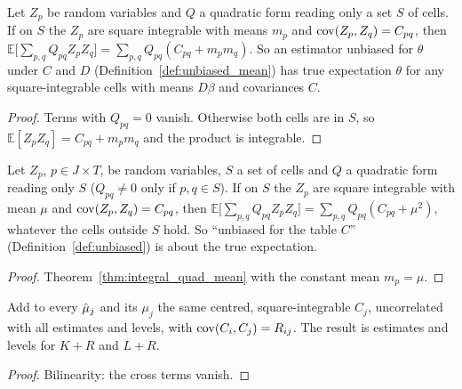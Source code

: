 \begin{theorem}\label{thm:integral_quad_mean}
  \leanok
  Let $Z_p$ be random variables and $Q$ a quadratic form reading only a set $S$ of cells. If
  on $S$ the $Z_p$ are square integrable with means $m_p$ and $\operatorname{cov}(Z_p,Z_q) = C_{pq}$, then
  $\mathbb E\bigl[\sum_{p,q} Q_{pq}Z_pZ_q\bigr] = \sum_{p,q} Q_{pq}(C_{pq} + m_pm_q)$. So an
  estimator unbiased for $\theta$ under $C$ and $D$ (Definition~\ref{def:unbiased_mean}) has
  true expectation $\theta$ for any square-integrable cells with means $D\beta$ and
  covariances $C$.
\end{theorem}
\begin{proof}
  \leanok
  Terms with $Q_{pq} = 0$ vanish. Otherwise both cells are in $S$, so
  $\mathbb E[Z_pZ_q] = C_{pq} + m_pm_q$ and the product is integrable.
\end{proof}

\begin{theorem}\label{thm:integral_quad_cov}
  \leanok
  Let $Z_p$, $p \in J \times T$, be random variables, $S$ a set of cells and
  $Q$ a quadratic form reading only $S$ ($Q_{pq} \ne 0$ only if $p, q \in S$).
  If on $S$ the $Z_p$ are square integrable with mean $\mu$ and
  $\operatorname{cov}(Z_p,Z_q) = C_{pq}$, then
  $\mathbb E\bigl[\sum_{p,q} Q_{pq}Z_pZ_q\bigr] = \sum_{p,q} Q_{pq}(C_{pq} + \mu^2)$,
  whatever the cells outside $S$ hold. So ``unbiased for the table $C$''
  (Definition~\ref{def:unbiased}) is about the true expectation.
\end{theorem}
\begin{proof}
  \leanok
  Theorem~\ref{thm:integral_quad_mean} with the constant mean $m_p = \mu$.
\end{proof}

\begin{lemma}\label{lem:Core_addCommon}
  \leanok
  Add to every $\hat\mu_j$ and its $\mu_j$ the same centred, square-integrable
  $C_j$, uncorrelated with all estimates and levels, with
  $\operatorname{cov}(C_i,C_j) = R_{ij}$. The result is estimates and levels for $K + R$
  and $L + R$.
\end{lemma}
\begin{proof}
  \leanok
  Bilinearity: the cross terms vanish.
\end{proof}

